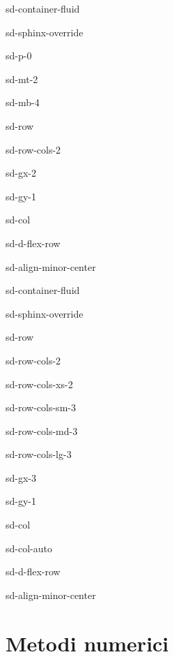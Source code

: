 \documentclass[letterpaper,10pt,english]{jupyterBook}
\begin{document}
\begin{sphinxuseclass}{sd-container-fluid}
\begin{sphinxuseclass}{sd-sphinx-override}
\begin{sphinxuseclass}{sd-p-0}
\begin{sphinxuseclass}{sd-mt-2}
\begin{sphinxuseclass}{sd-mb-4}
\begin{sphinxuseclass}{sd-row}
\begin{sphinxuseclass}{sd-row-cols-2}
\begin{sphinxuseclass}{sd-gx-2}
\begin{sphinxuseclass}{sd-gy-1}
\begin{sphinxuseclass}{sd-col}
\begin{sphinxuseclass}{sd-d-flex-row}
\begin{sphinxuseclass}{sd-align-minor-center}
\begin{sphinxuseclass}{sd-container-fluid}
\begin{sphinxuseclass}{sd-sphinx-override}
\begin{sphinxuseclass}{sd-row}
\begin{sphinxuseclass}{sd-row-cols-2}
\begin{sphinxuseclass}{sd-row-cols-xs-2}
\begin{sphinxuseclass}{sd-row-cols-sm-3}
\begin{sphinxuseclass}{sd-row-cols-md-3}
\begin{sphinxuseclass}{sd-row-cols-lg-3}
\begin{sphinxuseclass}{sd-gx-3}
\begin{sphinxuseclass}{sd-gy-1}
\begin{sphinxuseclass}{sd-col}
\begin{sphinxuseclass}{sd-col-auto}
\begin{sphinxuseclass}{sd-d-flex-row}
\begin{sphinxuseclass}{sd-align-minor-center}
\end{sphinxuseclass}
\end{sphinxuseclass}
\end{sphinxuseclass}
\end{sphinxuseclass}
\end{sphinxuseclass}
\end{sphinxuseclass}
\end{sphinxuseclass}
\end{sphinxuseclass}
\end{sphinxuseclass}
\end{sphinxuseclass}
\end{sphinxuseclass}
\end{sphinxuseclass}
\end{sphinxuseclass}
\end{sphinxuseclass}
\end{sphinxuseclass}
\end{sphinxuseclass}
\end{sphinxuseclass}
\end{sphinxuseclass}
\end{sphinxuseclass}
\end{sphinxuseclass}
\end{sphinxuseclass}
\end{sphinxuseclass}
\end{sphinxuseclass}
\end{sphinxuseclass}
\end{sphinxuseclass}
\end{sphinxuseclass}

\chapter{Metodi numerici}
\label{\detokenize{ch/numerical-methods:metodi-numerici}}\label{\detokenize{ch/numerical-methods:classical-electromagnetism-numerics}}\label{\detokenize{ch/numerical-methods::doc}}
\end{document}
